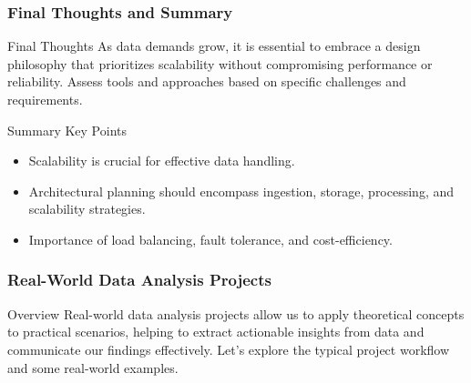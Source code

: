 \documentclass[aspectratio=169]{beamer}
\begin{document}
\begin{frame}[fragile]
    \frametitle{Final Thoughts and Summary}
    \begin{block}{Final Thoughts}
        As data demands grow, it is essential to embrace a design philosophy that prioritizes scalability without compromising performance or reliability. Assess tools and approaches based on specific challenges and requirements.
    \end{block}

    \begin{block}{Summary Key Points}
        \begin{itemize}
            \item Scalability is crucial for effective data handling.
            \item Architectural planning should encompass ingestion, storage, processing, and scalability strategies.
            \item Importance of load balancing, fault tolerance, and cost-efficiency.
        \end{itemize}
    \end{block}
\end{frame}

\begin{frame}
    \frametitle{Real-World Data Analysis Projects}
    \begin{block}{Overview}
        Real-world data analysis projects allow us to apply theoretical concepts to practical scenarios, helping to extract actionable insights from data and communicate our findings effectively. Let’s explore the typical project workflow and some real-world examples.
    \end{block}
\end{frame}
\end{document}
